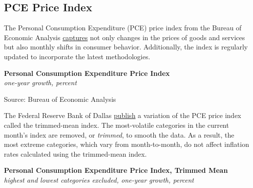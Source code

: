\documentclass{report}
\makeatletter
\newcommand{\tbllink}[1]{\href{https://raw.githubusercontent.com/bdecon/US-chartbook/master/chartbook/data/#1}{\faTable}}
\newcommand*\short[1]{\expandafter\@gobbletwo\number\numexpr#1\relax}
\newcommand{\dateaxisticks}{
		date coordinates in=x, axis line style={draw=none},
		xmax={2024-01-31},
		max space between ticks=40,	    
		xtick={{1990-01-01}, {1992-01-01}, {1994-01-01}, 
			{1996-01-01}, {1998-01-01}, {2000-01-01}, 
			{2002-01-01}, {2004-01-01}, {2006-01-01},
			{2008-01-01}, {2010-01-01}, {2012-01-01}, {2014-01-01},
		    {2016-01-01}, {2018-01-01}, {2020-01-01}, {2022-01-01}, 
		    {2024-01-01}, {2026-01-01}},
		minor xtick={{1989-01-01}, {1991-01-01}, {1993-01-01},
			{1995-01-01}, {1997-01-01}, {1999-01-01}, 
			{2001-01-01}, {2003-01-01}, {2005-01-01}, {2007-01-01},
		    {2009-01-01}, {2011-01-01}, {2013-01-01}, {2015-01-01},
		    {2017-01-01}, {2019-01-01}, {2021-01-01}, {2023-01-01}, 
		    {2025-01-01}, {2027-01-01}},
		enlarge y limits={0.06}, enlarge x limits={0.01},
		xticklabel style={align=center, yshift=-2pt}, tick label style={inner sep=0pt},
		}
\newcommand{\bbar}[2]{extra #1 ticks = {{#2}}, extra #1 tick labels = ,
		extra #1 tick style = {grid=major, grid style={thick, black!25}},}
\newcommand{\stdline}[4]{\addplot[very thick, no markers, color=#1] 
		table [x=#2, y=#3, col sep=comma] {#4};	}
\newcommand{\thickline}[4]{\addplot[ultra thick, no markers, color=#1] 
		table [x=#2, y=#3, col sep=comma] {#4};	}
\newcommand{\rbars}{
		\fill[color=black!10] (axis cs:{1990-07-01},\pgfkeysvalueof{/pgfplots/ymin})
			rectangle (axis cs:{1991-03-01}, \pgfkeysvalueof{/pgfplots/ymax});
		\fill[color=black!10] (axis cs:{2007-12-01},\pgfkeysvalueof{/pgfplots/ymin})
			rectangle (axis cs:{2009-07-01}, \pgfkeysvalueof{/pgfplots/ymax});
		\fill[color=black!10] (axis cs:{2001-03-01},\pgfkeysvalueof{/pgfplots/ymin})
			rectangle (axis cs:{2001-11-01}, \pgfkeysvalueof{/pgfplots/ymax});
		\fill[color=black!10] (axis cs:{2020-02-01},\pgfkeysvalueof{/pgfplots/ymin})
			rectangle (axis cs:{2020-05-01}, \pgfkeysvalueof{/pgfplots/ymax});}
\makeatother
\begin{document}
{{\begin{minipage}{1.0\textwidth}
\subsection*{PCE Price Index}
\small The Personal Consumption Expenditure (PCE) price index from the Bureau of Economic Analysis \href{https://www.bea.gov/data/personal-consumption-expenditures-price-index}{captures} not only changes in the prices of goods and services but also monthly shifts in consumer behavior. Additionally, the index is regularly updated to incorporate the latest methodologies.


\vspace{1mm}

\normalsize \textbf{Personal Consumption Expenditure Price Index}\\
\footnotesize{\textit{one-year growth, percent}}
\vspace{3.8cm}

\hspace{2mm} 

\footnotesize{Source: Bureau of Economic Analysis} \hfill \tbllink{pce_pi.csv}
\vspace{5mm}

\small The Federal Reserve Bank of Dallas \href{https://www.dallasfed.org/research/pce}{publish} a variation of the PCE price index called the trimmed-mean index. The most-volatile categories in the current month's index are removed, or \textit{trimmed}, to smooth the data. As a result, the most extreme categories, which vary from month-to-month, do not affect inflation rates calculated using the trimmed-mean index. 


\vspace{1mm}

\normalsize \textbf{Personal Consumption Expenditure Price Index, Trimmed Mean}\\
\footnotesize{\textit{highest and lowest categories excluded, one-year growth, percent}}
\vspace{2.9cm}


\end{minipage}}}
\end{document}
